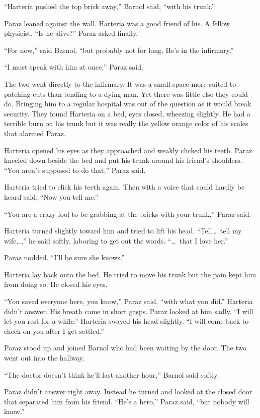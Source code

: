 ``Harteria pushed the top brick away,'' Barnol said, ``with his trunk.''

Paraz leaned against the wall. Harteria was a good friend of his. A fellow physicist. ``Is he
alive?'' Paraz asked finally.

``For now,'' said Barnol, ``but probably not for long. He's in the infirmary.''

``I must speak with him at once,'' Paraz said.

The two went directly to the infirmary. It was a small space more suited to patching cuts than
tending to a dying man. Yet there was little else they could do. Bringing him to a regular
hospital was out of the question as it would break security. They found Harteria on a bed, eyes
closed, wheezing slightly. He had a terrible burn on his trunk but it was really the yellow
orange color of his scales that alarmed Paraz.

Harteria opened his eyes as they approached and weakly clicked his teeth. Paraz kneeled down
beside the bed and put his trunk around his friend's shoulders. ``You aren't supposed to do
that,'' Paraz said.

Harteria tried to click his teeth again. Then with a voice that could hardly be heard said,
``Now you tell me.''

``You are a crazy fool to be grabbing at the bricks with your trunk,'' Paraz said.

Harteria turned slightly toward him and tried to lift his head. ``Tell\ldots\ tell my
wife\ldots,'' he said softly, laboring to get out the words. ``\ldots\ that I love her.''

Paraz nodded. ``I'll be sure she knows.''

Harteria lay back onto the bed. He tried to move his trunk but the pain kept him from doing so.
He closed his eyes.

``You saved everyone here, you know,'' Paraz said, ``with what you did.'' Harteria didn't
answer. His breath came in short gasps. Paraz looked at him sadly. ``I will let you rest for a
while.'' Harteria swayed his head slightly. ``I will come back to check on you after I get
settled.''

Paraz stood up and joined Barnol who had been waiting by the door. The two went out into the
hallway.

``The doctor doesn't think he'll last another hour,'' Barnol said softly.

Paraz didn't answer right away. Instead he turned and looked at the closed door that separated
him from his friend. ``He's a hero,'' Paraz said, ``but nobody will know.''
